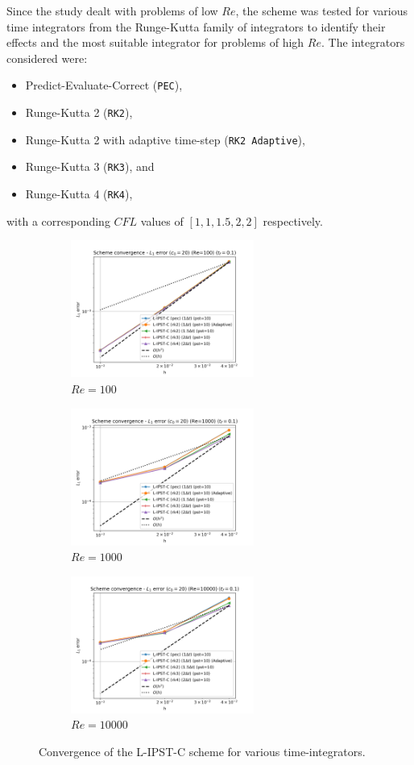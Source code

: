 Since the study dealt with problems of low $Re$, the scheme was tested for various time integrators from the Runge-Kutta family of integrators to identify their effects and the most suitable integrator for problems of high $Re$.
The integrators considered were:
\begin{itemize}
  \item Predict-Evaluate-Correct (\texttt{PEC}),
  \item Runge-Kutta 2 (\texttt{RK2}),
  \item Runge-Kutta 2 with adaptive time-step (\texttt{RK2 Adaptive}),
  \item Runge-Kutta 3 (\texttt{RK3}), and
  \item Runge-Kutta 4 (\texttt{RK4}),
\end{itemize}
with a corresponding $CFL$ values of $[1, 1, 1.5, 2, 2]$ respectively.

\begin{figure}[htbp!]
  \begin{subfigure}{7cm}
    \centering\includegraphics[width=6cm]{Code-Figures/lipstc/integrator/dt_pois_conv_c0_20_re_100.png}
    \caption{$Re = 100$}
  \end{subfigure}
  \begin{subfigure}{7cm}
    \centering\includegraphics[width=6cm]{Code-Figures/lipstc/integrator/dt_pois_conv_c0_20_re_1000.png}
    \caption{$Re = 1000$}
  \end{subfigure}
  \begin{subfigure}{7cm}
    \centering\includegraphics[width=6cm]{Code-Figures/lipstc/integrator/dt_pois_conv_c0_20_re_10000.png}
    \caption{$Re = 10000$}
  \end{subfigure}
  \caption{Convergence of the L-IPST-C scheme for various time-integrators.}
  \label{fig:lipstc-integrator}
\end{figure}

